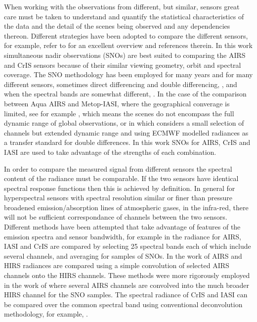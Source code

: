 \documentclass[11pt]{article}
\begin{document}
When working with the observations from different, but similar, sensors great care must be taken to understand and quantify the statistical characteristics of the data and the detail of the scenes being observed and any dependencies thereon. Different strategies have been adopted to compare the different sensors, for example, refer to \cite{Chander2013} for an excellent overview and references therein. In this work simultaneous nadir observations (SNOs) are best suited to comparing the AIRS and CrIS sensors because of their similar viewing geometry, orbit and spectral coverage. The SNO methodology has been employed for many years and for many different sensors, sometimes direct differencing \cite{Wang2007} and double differencing, \cite{Wang2011}, and when the spectral bands are somewhat different, \cite{Uprety2013}. In the case of the comparison between Aqua AIRS and Metop-IASI, where the geographical converage is limited, see for example \cite{GSICS2008}, which means the scenes do not encompass the full dynamic range of global observations, or in \cite{Elliott2009} which considers a small selection of channels but extended dynamic range and using ECMWF modelled radiances as a transfer standard for double differences. In this work SNOs for AIRS, CrIS and IASI are used to take advantage of the strengths of each combination.

In order to compare the measured signal from different sensors the spectral content of the radiance must be comparable. If the two sensors have identical spectral response functions then this is achieved by definition. In general for hyperspectral sensors with spectral resolution similar or finer than pressure broadened emission/absorption lines of atmospheric gases, in the infra-red, there will not be sufficient correspondance of channels between the two sensors. Different methods have been attempted that take advantage of features of the emission spectra and sensor bandwidth, for example in \cite{Wang2015} the radiance for AIRS, IASI and CrIS are compared by selecting 25 spectral bands each of which include several channels, and averaging for samples of SNOs. In the work of \cite{Ciren2003} AIRS and HIRS radiances are compared using a simple convolution of selected AIRS channels onto the HIRS channels. These methods were more rigorously employed in the work of \cite{Wang2007} where several AIRS channels are convolved into the much broader HIRS channel for the SNO samples. The spectral radiance of CrIS and IASI can be compared over the common spectral band using conventional deconvolution methodology, for example, \cite{Wang2015}.
\end{document}
